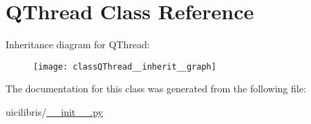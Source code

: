 \hypertarget{classQThread}{\section{\-Q\-Thread \-Class \-Reference}
\label{classQThread}
}


\-Inheritance diagram for \-Q\-Thread\-:
\nopagebreak
\begin{figure}[H]
\begin{center}
\leavevmode
\texttt{[image: classQThread\_\_inherit\_\_graph]}
\end{center}
\end{figure}


\-The documentation for this class was generated from the following file\-:\begin{DoxyCompactItemize}
\item 
uicilibris/\hyperlink{____init_____8py}{\-\_\-\-\_\-init\-\_\-\-\_\-.\-py}\end{DoxyCompactItemize}
